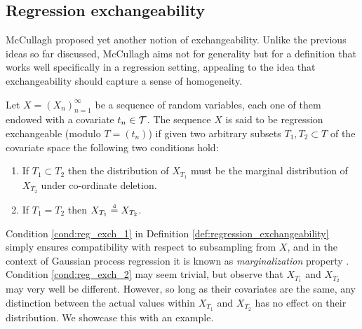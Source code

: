 \subsection{Regression exchangeability}



McCullagh \cite{McCullagh:2005:ExchAndReg} proposed yet another notion of exchangeability. Unlike the previous ideas so far discussed, McCullagh aims not for generality but for a definition that works well specifically in a regression setting, appealing to the idea that exchangeability should capture a sense of homogeneity.

\begin{definition}	\label{def:regression_exchangeability}
	Let $X = (X_n)_{n=1}^{\infty}$ be a sequence of random variables, each one of them endowed with a covariate $t_n \in \mathcal{T}$. The sequence $X$ is said to be regression exchangeable (modulo $T = (t_n)$) if given two arbitrary subsets $T_1, T_2 \subset T$ of the covariate space the following two conditions hold:
	\begin{enumerate}
		\item If $T_1 \subset T_2$ then the distribution of $X_{T_1}$ must be the marginal distribution of $X_{T_2}$ under co-ordinate deletion. \label{cond:reg_exch_1}
		\item If $T_1 = T_2$ then $X_{T_1} \stackrel{\text{\rm\tiny d}}{=} X_{T_2}$. \label{cond:reg_exch_2}
	\end{enumerate}
\end{definition}


Condition \ref{cond:reg_exch_1} in Definition \ref{def:regression_exchangeability} simply ensures compatibility with respect to subsampling from $X$, and in the context of Gaussian process regression it is known as \textit{marginalization} property \cite[][p.~13]{RasmussenWilliams:2006}. Condition \ref{cond:reg_exch_2} may seem trivial, but observe that $X_{T_1}$ and $X_{T_2}$ may very well be different. However, so long as their covariates are the same, any distinction between the actual values within $X_{T_1}$ and $X_{T_2}$ has no effect on their distribution. We showcase this with an example.



